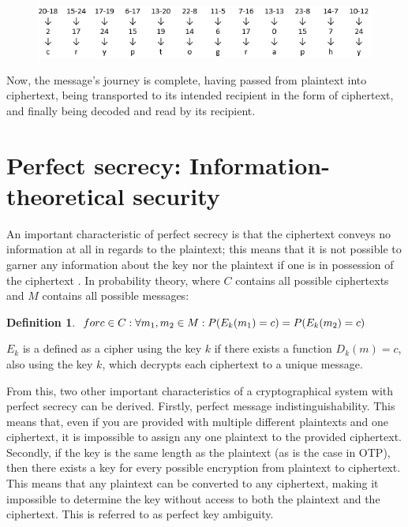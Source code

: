 \documentclass[12pt]{report}
\theoremstyle{definition}
\newtheorem{defin}[thm]{Definition}
\theoremstyle{remark}
\begin{document}
\begin{figure}[H]
\centering
\includegraphics[scale=1]{Table4.PNG}
\end{figure}

Now, the message's journey is complete, having passed from plaintext into ciphertext, being transported to its intended recipient in the form of ciphertext, and finally being decoded and read by its recipient. 

\section{Perfect secrecy: Information-theoretical security}
An important characteristic of perfect secrecy is that the ciphertext conveys no information at all in regards to the plaintext; this means that it is not possible to garner any information about the key nor the plaintext if one is in possession of the ciphertext \cite{PerfectSecrecy} \cite{HandbookOfAppliedCryptography}. In probability theory, where $C$ contains all possible ciphertexts and $M$ contains all possible messages:

\begin{defin}\label{def:perfectsecrecy}
$for c \in C: \\
\forall m_1, m_2 \in M: \\
P(E_k(m_1)=c) = P(E_k(m_2)=c)$
\end{defin}

$E_k$ is a defined as a cipher using the key $k$ if there exists a function $D_k(m)=c$, also using the key $k$, which decrypts each ciphertext to a unique message.

From this, two other important characteristics of a cryptographical system with perfect secrecy can be derived. Firstly, perfect message indistinguishability. This means that, even if you are provided with multiple different plaintexts and one ciphertext, it is impossible to assign any one plaintext to the provided ciphertext. Secondly, if the key is the same length as the plaintext (as is the case in OTP), then there exists a key for every possible encryption from plaintext to ciphertext. This means that any plaintext can be converted to any ciphertext, making it impossible to determine the key without access to both the plaintext and the ciphertext. This is referred to as perfect key ambiguity.		%
\end{document}
